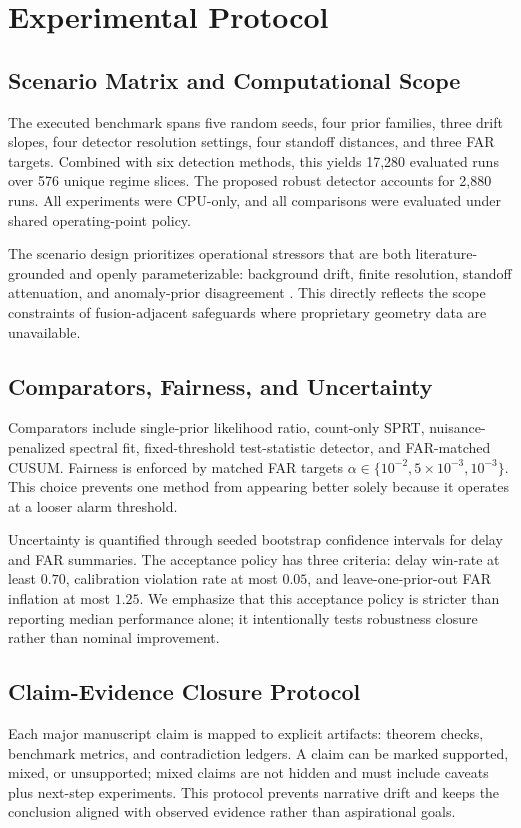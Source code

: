 \section{Experimental Protocol}\label{sec:protocol}
\subsection{Scenario Matrix and Computational Scope}
The executed benchmark spans five random seeds, four prior families, three drift slopes, four detector resolution settings, four standoff distances, and three FAR targets. Combined with six detection methods, this yields 17,280 evaluated runs over 576 unique regime slices. The proposed robust detector accounts for 2,880 runs. All experiments were CPU-only, and all comparisons were evaluated under shared operating-point policy.

The scenario design prioritizes operational stressors that are both literature-grounded and openly parameterizable: background drift, finite resolution, standoff attenuation, and anomaly-prior disagreement \citep{SRC001,SRC009,SRC014,SRC017,SRC023}. This directly reflects the scope constraints of fusion-adjacent safeguards where proprietary geometry data are unavailable.

\subsection{Comparators, Fairness, and Uncertainty}
Comparators include single-prior likelihood ratio, count-only SPRT, nuisance-penalized spectral fit, fixed-threshold test-statistic detector, and FAR-matched CUSUM. Fairness is enforced by matched FAR targets $\alpha\in\{10^{-2},5\times10^{-3},10^{-3}\}$. This choice prevents one method from appearing better solely because it operates at a looser alarm threshold.

Uncertainty is quantified through seeded bootstrap confidence intervals for delay and FAR summaries. The acceptance policy has three criteria: delay win-rate at least $0.70$, calibration violation rate at most $0.05$, and leave-one-prior-out FAR inflation at most $1.25$. We emphasize that this acceptance policy is stricter than reporting median performance alone; it intentionally tests robustness closure rather than nominal improvement.

\subsection{Claim-Evidence Closure Protocol}
Each major manuscript claim is mapped to explicit artifacts: theorem checks, benchmark metrics, and contradiction ledgers. A claim can be marked supported, mixed, or unsupported; mixed claims are not hidden and must include caveats plus next-step experiments. This protocol prevents narrative drift and keeps the conclusion aligned with observed evidence rather than aspirational goals.

